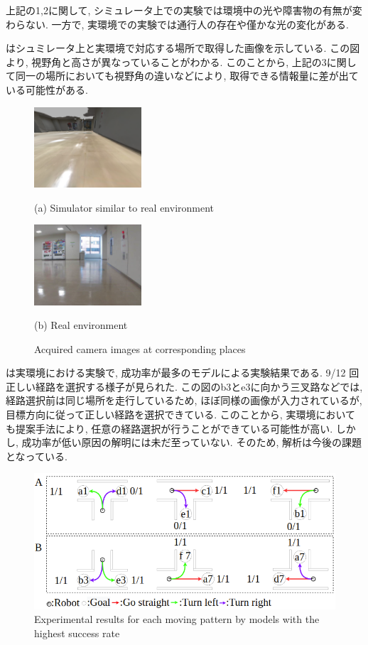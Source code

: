 上記の1,2に関して, シミュレータ上での実験では環境中の光や障害物の有無が変わらない. 一方で, 実環境での実験では通行人の存在や僅かな光の変化がある. 
\par
{}はシュミレータ上と実環境で対応する場所で取得した画像を示している. この図より, 視野角と高さが異なっていることがわかる. このことから, 上記の3に関して同一の場所においても視野角の違いなどにより, 取得できる情報量に差が出ている可能性がある.

\begin{figure}[h]
  \centering
  \begin{minipage}[b]{67mm}
    \centering
    \includegraphics[width=40mm]{images/horizonal_sim.png}
    \caption*{(a) Simulator similar to real environment}
  \end{minipage} 
  \begin{minipage}[b]{67mm}
    \centering
    \includegraphics[width=40mm]{images/horizonal_real.png}
    \caption*{(b) Real environment}
  \end{minipage}
  \caption{Acquired camera images at corresponding places}
  \label{Fig:horizonal}
\end{figure}

は実環境における実験で, 成功率が最多のモデルによる実験結果である. 9/12 回正しい経路を選択する様子が見られた. この図のb3とe3に向かう三叉路などでは, 経路選択前は同じ場所を走行しているため, ほぼ同様の画像が入力されているが, 目標方向に従って正しい経路を選択できている. このことから, 実環境においても提案手法により, 任意の経路選択が行うことができている可能性が高い.
しかし, 成功率が低い原因の解明には未だ至っていない. そのため, 解析は今後の課題となっている.

\begin{figure}[hbtp]
  \centering
 \includegraphics[keepaspectratio, scale=0.45]
      {images/real_model3.png}
 \caption{Experimental results for each moving pattern by models with the highest success rate}
 \label{Fig:real_model3}
\end{figure}

\newpage
